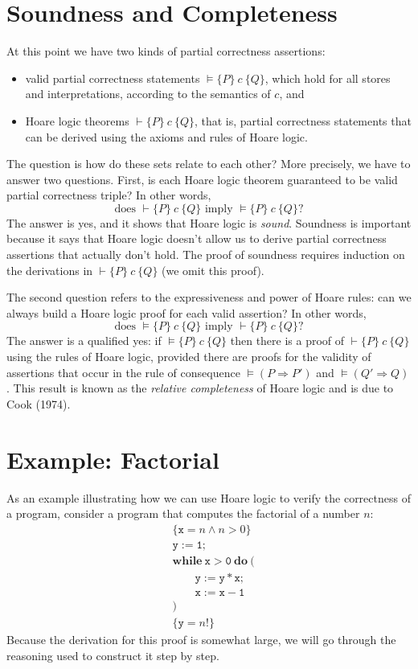 \section{Soundness and Completeness}

At this point we have two kinds of partial correctness assertions:
\begin{itemize}
    \item valid partial correctness statements $\models \{P\}\ c\ \{Q\}$, which hold for all
    stores and interpretations, according to the semantics of $c$, and
    \item Hoare logic theorems $\vdash \{P\}\ c\ \{Q\}$, that is, partial correctness
    statements that can be derived using the axioms and rules of Hoare logic.
\end{itemize}
The question is how do these sets relate to each other? More precisely, we have to answer two
questions. First, is each Hoare logic theorem guaranteed to be valid partial correctness
triple? In other words,
\[
\text{does } \vdash \{P\}\ c\ \{Q\} \text{ imply } \models \{P\}\ c\ \{Q\}?
\]
The answer is yes, and it shows that Hoare logic is \emph{sound}. Soundness is important
because it says that Hoare logic doesn't allow us to derive partial correctness assertions that
actually don't hold. The proof of soundness requires induction on the derivations in $\vdash
\{P\}\ c\ \{Q\}$ (we omit this proof).

The second question refers to the expressiveness and power of Hoare rules: can we always build
a Hoare logic proof for each valid assertion? In other words,
\[
\text{does } \models \{P\}\ c\ \{Q\} \text{ imply } \vdash \{P\}\ c\ \{Q\}?
\]
The answer is a qualified yes: if $\models \{P\}\ c\ \{Q\}$ then there is a proof of $\vdash
\{P\}\ c\ \{Q\}$ using the rules of Hoare logic, provided there are proofs for the validity of
assertions that occur in the rule of consequence $\models (P \Rightarrow P')$ and $\models (Q'
\Rightarrow Q)$. This result is known as the \emph{relative completeness} of Hoare logic and is
due to Cook (1974).

\section{Example: Factorial}

As an example illustrating how we can use Hoare logic to verify the correctness of a program,
consider a program that computes the factorial of a number $n$:
\begin{align*}
&\{\mathtt{x} = n \wedge n > 0\} \\
&\mathtt{y := 1;} \\
&\mathbf{while}\ \mathtt{x > 0}\ \mathbf{do}\ ( \\
&\qquad \mathtt{y := y * x;} \\
&\qquad \mathtt{x := x - 1} \\
&) \\
&\{\mathtt{y} = n!\}
\end{align*}
Because the derivation for this proof is somewhat large, we will go through the reasoning used
to construct it step by step.

